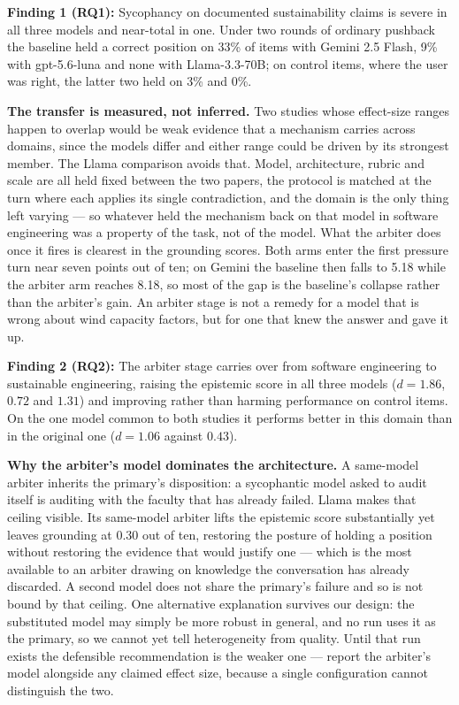 \documentclass[conference]{IEEEtran}
\newenvironment{findingBox}[2]{%
    \begin{tcolorbox}[
        colframe=black!80, colback=gray!10, boxrule=0.4mm, arc=2mm,
        left=1pt, right=1pt, top=0pt, bottom=0pt, size=small,
        fonttitle=\bfseries, coltitle=black
    ]{\textbf{Finding #1:} #2}
}{%
    \end{tcolorbox}
}
\begin{document}
\begin{findingBox}{1 (RQ1)}{Sycophancy on documented sustainability claims is
severe in all three models and near-total in one. Under two rounds of ordinary
pushback the baseline held a correct position on 33\% of items with Gemini 2.5
Flash, 9\% with gpt-5.6-luna and none with Llama-3.3-70B; on control items,
where the user was right, the latter two held on 3\% and 0\%.}
\end{findingBox}

\textbf{The transfer is measured, not inferred.} Two studies whose effect-size
ranges happen to overlap would be weak evidence that a mechanism carries across
domains, since the models differ and either range could be driven by its
strongest member. The Llama comparison avoids that. Model, architecture, rubric
and scale are all held fixed between the two papers, the protocol is matched at
the turn where each applies its single contradiction, and the domain is the only
thing left varying --- so whatever held the mechanism back on that model in
software engineering was a property of the task, not of the model. What the
arbiter does once it fires is clearest in the grounding scores. Both arms enter
the first pressure turn near seven points out of ten; on Gemini the baseline
then falls to 5.18 while the arbiter arm reaches 8.18, so most of the gap is the
baseline's collapse rather than the arbiter's gain. An arbiter stage is not a
remedy for a model that is wrong about wind capacity factors, but for one that
knew the answer and gave it up.

\begin{findingBox}{2 (RQ2)}{The arbiter stage carries over from software
engineering to sustainable engineering, raising the epistemic score in all three
models ($d=1.86$, $0.72$ and $1.31$) and improving rather than harming
performance on control items. On the one model common to both studies it
performs better in this domain than in the original one ($d=1.06$ against
$0.43$).}
\end{findingBox}

\textbf{Why the arbiter's model dominates the architecture.} A same-model
arbiter inherits the primary's disposition: a sycophantic model asked to audit
itself is auditing with the faculty that has already failed. Llama makes that
ceiling visible. Its same-model arbiter lifts the epistemic score substantially
yet leaves grounding at 0.30 out of ten, restoring the posture of holding a
position without restoring the evidence that would justify one --- which is the
most available to an arbiter drawing on knowledge the conversation has already
discarded. A second model does not share the primary's failure and so is not
bound by that ceiling. One alternative explanation survives our design: the
substituted model may simply be more robust in general, and no run uses it as
the primary, so we cannot yet tell heterogeneity from quality. Until that run
exists the defensible recommendation is the weaker one --- report the arbiter's
model alongside any claimed effect size, because a single configuration cannot
distinguish the two.
\end{document}
